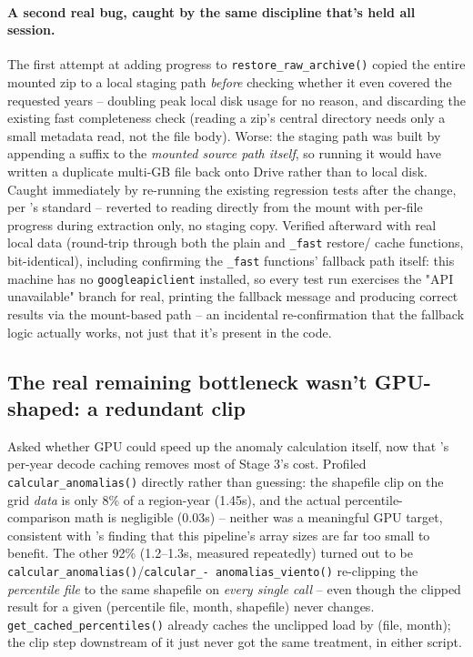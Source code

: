 \documentclass[11pt]{article}
\begin{document}
\paragraph{A second real bug, caught by the same discipline that's held
all session.} The first attempt at adding progress to
\texttt{restore\_raw\_archive()} copied the entire mounted zip to a
local staging path \emph{before} checking whether it even covered the
requested years -- doubling peak local disk usage for no reason, and
discarding the existing fast completeness check (reading a zip's central
directory needs only a small metadata read, not the file body). Worse:
the staging path was built by appending a suffix to the \emph{mounted
source path itself}, so running it would have written a duplicate
multi-GB file back onto Drive rather than to local disk. Caught
immediately by re-running the existing regression tests after the
change, per 's standard -- reverted to
reading directly from the mount with per-file progress during
extraction only, no staging copy. Verified afterward with real local
data (round-trip through both the plain and \texttt{\_fast} restore/
cache functions, bit-identical), including confirming the \texttt{\_fast}
functions' fallback path itself: this machine has no
\texttt{googleapiclient} installed, so every test run exercises the
"API unavailable" branch for real, printing the fallback message and
producing correct results via the mount-based path -- an incidental
re-confirmation that the fallback logic actually works, not just that
it's present in the code.

\subsection{The real remaining bottleneck wasn't GPU-shaped: a redundant clip}
\label{sec:clipped-percentile-cache}

Asked whether GPU could speed up the anomaly calculation itself, now that
's per-year decode caching removes most of
Stage 3's cost. Profiled \texttt{calcular\_anomalias()} directly rather
than guessing: the shapefile clip on the grid \emph{data} is only 8\% of
a region-year (1.45s), and the actual percentile-comparison math is
negligible (0.03s) -- neither was a meaningful GPU target, consistent
with 's finding that this pipeline's array sizes are far
too small to benefit. The other 92\% (1.2--1.3s, measured repeatedly)
turned out to be \texttt{calcular\_anomalias()}/\texttt{calcular\_-
anomalias\_viento()} re-clipping the \emph{percentile file} to the same
shapefile on \emph{every single call} -- even though the clipped result
for a given (percentile file, month, shapefile) never changes.
\texttt{get\_cached\_percentiles()} already caches the unclipped load by
(file, month); the clip step downstream of it just never got the same
treatment, in either script.
\end{document}
